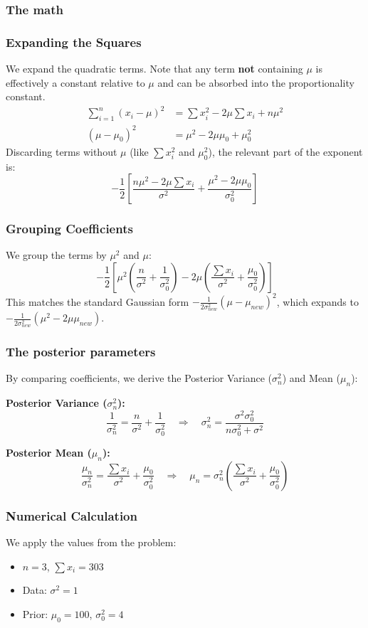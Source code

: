 \documentclass[../Probability.tex]{subfiles}
\begin{document}
\subsubsection{The math}
\subsubsection*{Expanding the Squares}
We expand the quadratic terms. Note that any term \textbf{not} containing $\mu$ is effectively a constant relative to $\mu$ and can be absorbed into the proportionality constant.
\begin{align*}
\sum_{i=1}^{n}(x_i - \mu)^2 &= \sum x_i^2 - 2\mu\sum x_i + n\mu^2 \\
(\mu - \mu_0)^2 &= \mu^2 - 2\mu\mu_0 + \mu_0^2
\end{align*}
Discarding terms without $\mu$ (like $\sum x_i^2$ and $\mu_0^2$), the relevant part of the exponent is:
\[
-\frac{1}{2} \left[ \frac{n\mu^2 - 2\mu\sum x_i}{\sigma^2} + \frac{\mu^2 - 2\mu\mu_0}{\sigma_0^2} \right]
\]

\subsubsection*{Grouping Coefficients}
We group the terms by $\mu^2$ and $\mu$:
\[
-\frac{1}{2} \left[ \mu^2 \left( \frac{n}{\sigma^2} + \frac{1}{\sigma_0^2} \right) - 2\mu \left( \frac{\sum x_i}{\sigma^2} + \frac{\mu_0}{\sigma_0^2} \right) \right]
\]
This matches the standard Gaussian form $-\frac{1}{2\sigma_{new}^2}(\mu - \mu_{new})^2$, which expands to $-\frac{1}{2\sigma_{new}^2}(\mu^2 - 2\mu\mu_{new})$.

\subsubsection{The posterior parameters}
By comparing coefficients, we derive the Posterior Variance ($\sigma_n^2$) and Mean ($\mu_n$):

\noindent\textbf{Posterior Variance ($\sigma_n^2$):}
\[
\frac{1}{\sigma_n^2} = \frac{n}{\sigma^2} + \frac{1}{\sigma_0^2} \quad \Rightarrow \quad \sigma_n^2 = \frac{\sigma^2 \sigma_0^2}{n\sigma_0^2 + \sigma^2}
\]

\noindent\textbf{Posterior Mean ($\mu_n$):}
\[
\frac{\mu_n}{\sigma_n^2} = \frac{\sum x_i}{\sigma^2} + \frac{\mu_0}{\sigma_0^2} \quad \Rightarrow \quad \mu_n = \sigma_n^2 \left( \frac{\sum x_i}{\sigma^2} + \frac{\mu_0}{\sigma_0^2} \right)
\]

\subsubsection*{Numerical Calculation}
We apply the values from the problem:
\begin{itemize}
    \item $n = 3$, $\sum x_i = 303$
    \item Data: $\sigma^2 = 1$
    \item Prior: $\mu_0 = 100$, $\sigma_0^2 = 4$
\end{itemize}
\end{document}
